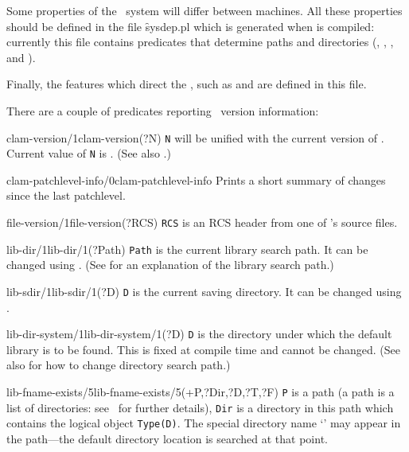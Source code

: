 Some properties of the \clam\ system will differ between machines.
All these properties should be defined in the file \f{sysdep.pl} which
is generated when \clam is compiled: currently this file contains
predicates that determine paths and directories (,
, ,  and
). 


Finally, the features which direct the ,
such as  and  are defined in this file.

There are a couple of predicates reporting \clam\ version information:

\begin{predicate}{clam-version/1}{clam-version(?N)}%
{\tt N} will be unified with the current version of \clam. Current
value of {\tt N} is \version. (See also .)
\end{predicate}

\begin{predicate}{clam-patchlevel-info/0}{clam-patchlevel-info}%
Prints a short summary of changes since the last patchlevel.
\end{predicate}

\begin{predicate}{file-version/1}{file-version(?RCS)}%
{\tt RCS} is an RCS header from one of \clam's source files.  
\end{predicate}

\begin{predicate}{lib-dir/1}{lib-dir/1(?Path)}%
{\tt Path} is the current \clam{} library search path.  It can be
changed using .  (See  for an explanation of
the library search path.)
\end{predicate}

\begin{predicate}{lib-sdir/1}{lib-sdir/1(?D)}%
{\tt D} is the current \clam{} saving directory.  It can be
changed using . 
\end{predicate}

\begin{predicate}{lib-dir-system/1}{lib-dir-system/1(?D)}%
{\tt D} is the directory under which the default \clam{} library is to
be found.  This is fixed at compile time and cannot be changed.  (See
also  for how to change \clam{} directory search path.)
\end{predicate}

\begin{predicate}{lib-fname-exists/5}{lib-fname-exists/5(+P,?Dir,?D,?T,?F)}%
{\tt P} is a path (a path is a list of directories: see~
for further details), {\tt Dir} is a directory in this path which
contains the logical object {\tt Type(D)}.  The special directory name
`{\tt *}' may appear in the path---the default \clam{} directory
location is searched at that point.
\end{predicate}

